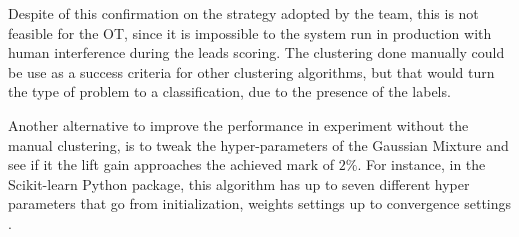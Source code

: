 Despite of this confirmation on the strategy adopted by the team, this is not feasible for the OT, since it is impossible to the system run in production with human interference during the leads scoring. The clustering done manually could be use as a success criteria for other clustering algorithms, but that would turn the type of problem to a classification, due to the presence of the labels.

Another alternative to improve the performance in experiment \nameExperimentII{} without the manual clustering, is to tweak the hyper-parameters of the Gaussian Mixture and see if it the lift gain approaches the achieved mark of $2\%$. For instance, in the Scikit-learn Python package, this algorithm has up to seven different hyper parameters that go from initialization, weights settings up to convergence settings \cite{scikit-learn}.